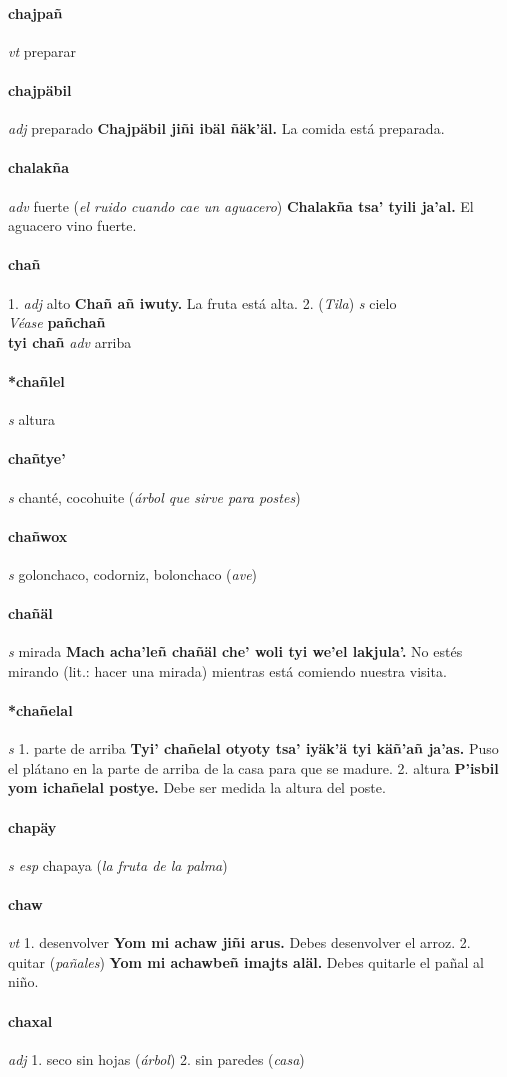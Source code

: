 \documentclass{scrbook}
\newcommand{\entry}[1]{\paragraph{#1}}
\newcommand{\onedefinition}[1]{#1.}
\newcommand{\partofspeech}[1]{\textit{#1}}
\newcommand{\spanishtranslation}[1]{#1}
\newcommand{\clarification}[1]{(\textit{#1})}
\newcommand{\cholexample}[1]{\textbf{#1}}
\newcommand{\exampletranslation}[1]{#1}
\newcommand{\alsosee}[1]{\\\textit{Véase} \textbf{#1}}
\newcommand{\relevantdialect}[1]{(\textit{#1})}
\newcommand{\secondaryentry}[1]{\\\textbf{#1}}
\newcommand{\secondpartofspeech}[1]{\textit{#1}}
\newcommand{\secondtranslation}[1]{#1}
\begin{document}
\begin{multicols}{2}
\entry{chajpañ}
\partofspeech{vt}
\spanishtranslation{preparar}

\entry{chajpäbil}
\partofspeech{adj}
\spanishtranslation{preparado}
\cholexample{Chajpäbil jiñi ibäl ñäk'äl.}
\exampletranslation{La comida está preparada.}

\entry{chalakña}
\partofspeech{adv}
\spanishtranslation{fuerte}
\clarification{el ruido cuando cae un aguacero}
\cholexample{Chalakña tsa' tyili ja'al.}
\exampletranslation{El aguacero vino fuerte.}

\entry{chañ}
\onedefinition{1}
\partofspeech{adj}
\spanishtranslation{alto}
\cholexample{Chañ añ iwuty.}
\exampletranslation{La fruta está alta.}
\onedefinition{2}
\relevantdialect{Tila}
\partofspeech{s}
\spanishtranslation{cielo}
\alsosee{pañchañ}
\secondaryentry{tyi chañ}
\secondpartofspeech{adv}
\secondtranslation{arriba}

\entry{*chañlel}
\partofspeech{s}
\spanishtranslation{altura}

\entry{chañtye'}
\partofspeech{s}
\spanishtranslation{chanté, cocohuite}
\clarification{árbol que sirve para postes}

\entry{chañwox}
\partofspeech{s}
\spanishtranslation{golonchaco, codorniz, bolonchaco}
\clarification{ave}

\entry{chañäl}
\partofspeech{s}
\spanishtranslation{mirada}
\cholexample{Mach acha'leñ chañäl che' woli tyi we'el lakjula'.}
\exampletranslation{No estés mirando (lit.: hacer una mirada) mientras está comiendo nuestra visita.}

\entry{*chañelal}
\partofspeech{s}
\onedefinition{1}
\spanishtranslation{parte de arriba}
\cholexample{Tyi' chañelal otyoty tsa' iyäk'ä tyi käñ'añ ja'as.}
\exampletranslation{Puso el plátano en la parte de arriba de la casa para que se madure.}
\onedefinition{2}
\spanishtranslation{altura}
\cholexample{P'isbil yom ichañelal postye.}
\exampletranslation{Debe ser medida la altura del poste.}

\entry{chapäy}
\partofspeech{s esp}
\spanishtranslation{chapaya}
\clarification{la fruta de la palma}

\entry{chaw}
\partofspeech{vt}
\onedefinition{1}
\spanishtranslation{desenvolver}
\cholexample{Yom mi achaw jiñi arus.}
\exampletranslation{Debes desenvolver el arroz.}
\onedefinition{2}
\spanishtranslation{quitar}
\clarification{pañales}
\cholexample{Yom mi achawbeñ imajts aläl.}
\exampletranslation{Debes quitarle el pañal al niño.}

\entry{chaxal}
\partofspeech{adj}
\onedefinition{1}
\spanishtranslation{seco sin hojas}
\clarification{árbol}
\onedefinition{2}
\spanishtranslation{sin paredes}
\clarification{casa}


\end{multicols}
\end{document}
